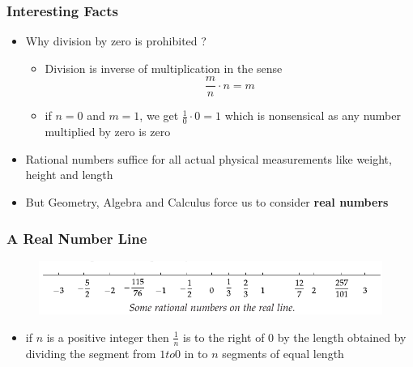 \documentclass{beamer}
\begin{document}
\begin{frame}
    \frametitle{Interesting Facts}
    \begin{itemize} 
        \item Why division by zero is prohibited ?
        \begin{itemize}
            \item Division is inverse of multiplication in the sense  
            \[  
            \frac{m}{n} \cdot n = m
            \]
        \item if \( n=0 \) and \( m = 1\), we get \(\frac{1}{0} \cdot 0 = 1\) which is nonsensical as any number multiplied by zero is zero
        \end{itemize}
        \item Rational numbers suffice for all actual physical measurements like weight, height and length
        \item But Geometry, Algebra and Calculus force us to consider \textbf{real numbers}
    \end{itemize}

\end{frame}

\begin{frame}
    \frametitle{A Real Number Line}
    \begin{figure}[h]    
        \begin{minipage}[b]{0.8\textwidth}
        \centering
        \includegraphics[scale=0.35]{real-line.png}
    \end{minipage}
\end{figure}
\begin{itemize}
    \item if \( n\) is a positive integer then \( \frac{1}{n}\) is to the right of 0 by the length obtained by dividing the segment from \( 1 to 0\) in to \( n \) segments of equal length
\end{itemize}

\end{frame}
\end{document}
